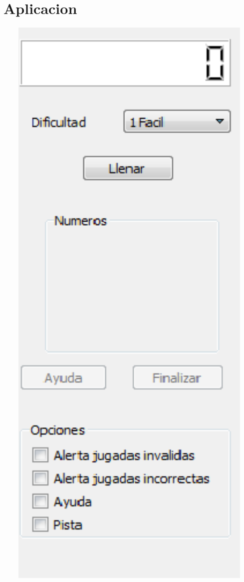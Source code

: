 \documentclass[12pt,oneside]{book}
\begin{document}
\chapter{Aplicacion}
	\includegraphics[width=1.10\textwidth]{./imagenes/Panel_izquierdo.png}
\end{document}
